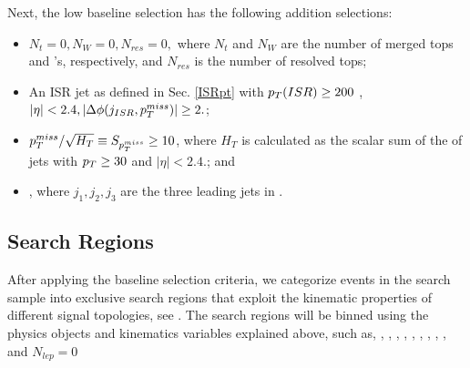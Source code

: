Next, the low \dm{} baseline selection has the following addition selections:
\begin{itemize}
	\item $N_t=0, N_W=0,N_{res}=0,$ where $N_t$ and $N_W$ are the number of merged tops and \W's, respectively, and $N_{res}$ is the number of resolved tops;
	\item An ISR jet as defined in Sec. \ref{ISRpt} with $p_{T}(ISR)\geq200$ \GeV, $|\eta|<2.4, |\Delta\phi(j_{ISR},p_{T}^{miss})|\geq2.$;
	\item $p_{T}^{miss}/\sqrt{H_{T}}\equiv S_{p_{T}^{miss}}\geq10$, where $H_T$ is calculated as the scalar sum of the \pt{} of jets with $p_{T}\geq30$ \GeV{} and $|\eta|<2.4.$; and
	\item \lowdm, where $j_1,j_2,j_3$ are the three leading jets in \pt. 
\end{itemize}

\subsection{Search Regions}\label{SearchRegions}

After applying the baseline selection criteria, we categorize events in the search sample into exclusive search regions that exploit the kinematic properties of different signal topologies, see \cite{cms_collaboration_search_2016, alwall_simplified_2009, alwall_model-independent_2009}. The search regions will be binned using the physics objects and kinematics variables explained above, such as, \nj, \nb, \nt, \nrt, \nw, \met, \Ht, \nsv, \mtb, and $N_{lep}=0$

